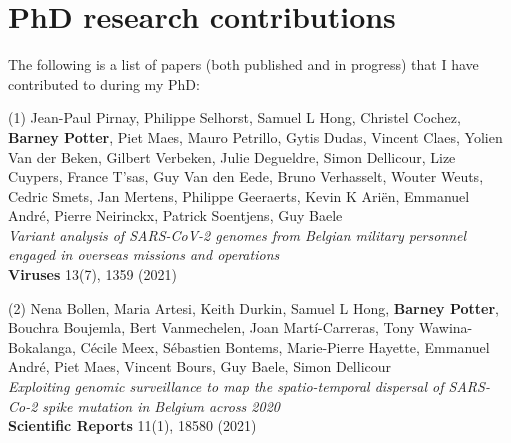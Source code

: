 \chapter{PhD research contributions}
\label{ch:myappendix}

The following is a list of papers (both published and in progress) that I have contributed to during my PhD:

(1) Jean-Paul Pirnay, Philippe Selhorst, Samuel L Hong, Christel Cochez, \textbf{Barney Potter}, Piet Maes, Mauro Petrillo, Gytis Dudas, Vincent Claes, Yolien Van der Beken, Gilbert Verbeken, Julie Degueldre, Simon Dellicour, Lize Cuypers, France T’sas, Guy Van den Eede, Bruno Verhasselt, Wouter Weuts, Cedric Smets, Jan Mertens, Philippe Geeraerts, Kevin K Ariën, Emmanuel André, Pierre Neirinckx, Patrick Soentjens, Guy Baele\\
\textit{Variant analysis of SARS-CoV-2 genomes from Belgian military personnel engaged in overseas missions and operations}\\
\textbf{Viruses} 13(7), 1359 (2021)

(2) Nena Bollen, Maria Artesi, Keith Durkin, Samuel L Hong, \textbf{Barney Potter}, Bouchra Boujemla, Bert Vanmechelen, Joan Martí-Carreras, Tony Wawina-Bokalanga, Cécile Meex, Sébastien Bontems, Marie-Pierre Hayette, Emmanuel André, Piet Maes, Vincent Bours, Guy Baele, Simon Dellicour\\
\textit{Exploiting genomic surveillance to map the spatio-temporal dispersal of SARS-Co-2 spike mutation in Belgium across 2020}\\
\textbf{Scientific Reports} 11(1), 18580 (2021)

